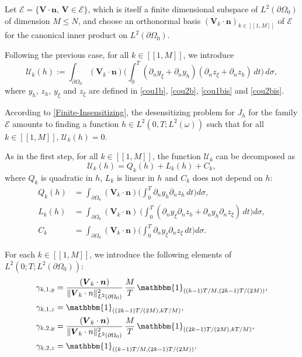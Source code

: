\documentclass[JEP,XML,SOM,Unicode,NoFloatCountersInSection]{cedram}
\newcommand{\llbracket}{[\![}
\newcommand{\rrbracket}{]\!]}
\newcommand{\bn}{\boldsymbol{n}}
\newcommand{\bV}{\boldsymbol{V}}
\newcommand{\norm}[1]{\Vert#1\Vert}
\theoremstyle{definition}
\begin{document}
Let $\mathscr{E} = \{ \bV\cdot \bn,\, \bV \in \mathcal{E}\}$, which is itself a finite dimensional subspace of $L^2(\partial\Omega_0)$ of dimension $M\leqslant N$, and choose an orthonormal basis $(\bV_k\cdot \bn)_{k \in \llbracket 1, M\rrbracket}$ of $\mathscr{E}$ for the canonical inner product on $L^2(\partial\Omega_0)$.

Following the previous case, for all $k \in \llbracket 1,M \rrbracket $, we introduce
\begin{equation}
\label{argenton2}
\mathcal{U}_k(h):=
\int_{\partial\Omega_{0}}(\bV_k\cdot \bn)
\biggl(\int_{0}^{T}(\partial_{n} y_{\xi} + \partial_n y_h) (\partial_{n} z_{\xi} + \partial_n z_h)\, dt \biggr)
\, d\sigma,
\end{equation}
where $y_{h}$, $z_{h}$, $ y_{\xi}$ and $z_{\xi}$ are defined in \eqref{cou1b}, \eqref{cou2b}, \eqref{cou1bis} and \eqref{cou2bis}.

According to \eqref{Finite-Insensitizing}, the desensitizing problem for $J_h$ for the family $\mathcal{E}$ amounts to finding {a function} $h \in L^2(0,T; L^2(\omega))$ such that for all $k \in \llbracket 1,M \rrbracket $, $\mathcal{U}_k(h) = 0$.

As in the first step, for all $k \in \llbracket 1,M \rrbracket $, the function $\mathcal{U}_k$ can be decomposed as
\begin{equation}
\label{Decomposition-U-k}
\mathcal{U}_k(h)=Q_k(h)+L_k(h)+C_k,
\end{equation}
where $Q_k$ is quadratic in $h$, $L_k$ is linear in $h$ and $C_k$ does not depend on $h$:
\begin{align}
\label{Def-Q-k}
Q_k(h)&= \int_{\partial \Omega_0} (\bV_k\cdot \bn)
\biggl(\int_0^T \partial_{n} y_{h}\partial_{n} z_{h}\, dt\biggr) d\sigma,
\\
\label{Def-L-k}
L_k(h)&= \int_{\partial \Omega_0}(\bV_k\cdot \bn) \
\biggl(\int_0^T (\partial_{n} y_{\xi}\partial_{n} z_{h}+\partial_{n} y_{h}\partial_{n} z_{\xi})\, dt \biggr)d\sigma,
\\
\label{Def-C-k}
C_k&= \int_{\partial \Omega_0} (\bV_k\cdot \bn)
\biggl(\int_0^T \partial_{n} y_{\xi}\partial_{n} z_{\xi}\, dt \biggr)
d\sigma.
\end{align}

For each $k \in \llbracket 1,M \rrbracket $, we introduce the following elements of $L^2(0;T; L^2(\partial \Omega_0))$:
\begin{align*}
\gamma_{k,1,y} &= \frac{(\bV_k \cdot \bn)}{\norm{\bV_k\cdot n}_{L^2(\partial\Omega_0)}^2}\,\frac{M }{T}\, \mathbbm{1}_{((k-1)T/M,(2k-1)T/(2M))},\\
 \gamma_{k,1,z} &= \mathbbm{1}_{((2k-1)T/(2M), kT/M)},\\
\gamma_{k,2, y} &= \frac{(\bV_k \cdot \bn)}{\norm{\bV_k\cdot n}_{L^2(\partial\Omega_0)}^2}\,\frac{M}{T}\,\mathbbm{1}_{((2k-1)T/(2M), kT/M)},\\
\gamma_{k,2, z} &= \mathbbm{1}_{((k-1)T/M,(2k-1)T/(2M))}.
\end{align*}
\end{document}
